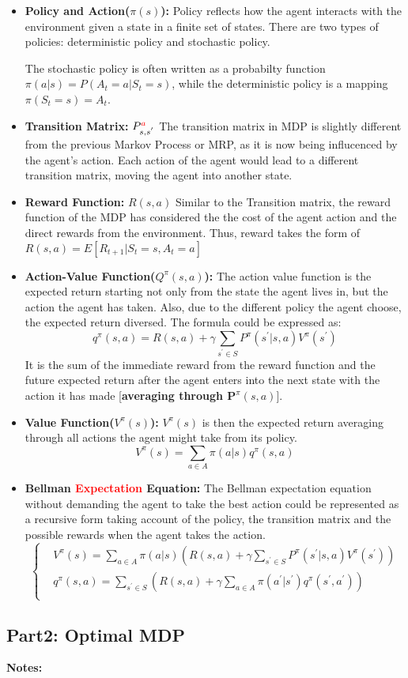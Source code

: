 \documentclass{article}
\begin{document}
\begin{itemize}
    \item \textbf{Policy and Action($\pi(s)$):} Policy reflects how the agent interacts with the environment given a state in a finite set of states.
    There are two types of policies: deterministic policy and stochastic policy. 
    
    The stochastic policy is often written as a probabilty function$\pi(a|s) = P(A_t = a|S_t = s)$, while the deterministic policy is a mapping $\pi(S_t = s) = A_t$.
    \item \textbf{Transition Matrix:} $P^{\textcolor{red}{a}}_{s,s^{'}}$ The transition matrix in MDP is slightly different
    from the previous Markov Process or MRP, as it is now being influcenced by the agent's action. Each action of the agent
    would lead to a different transition matrix, moving the agent into another state. 
    \item \textbf{Reward Function:} $R(s,a)$ Similar to the Transition matrix, the reward function of the MDP has considered
    the the cost of the agent action and the direct rewards from the environment. Thus, reward takes the form of $R(s,a) = 
    E[R_{t+1}|S_t = s, A_t = a]$
    \item \textbf{Action-Value Function($Q^\pi(s,a)$):}  The action value function is the expected return starting not only 
    from the state the agent lives in, but the action the agent has taken. Also, due to the different policy the agent
    choose, the expected return diversed. The formula could be expressed as:
    $$q^\pi(s,a) = R(s,a) + \gamma\sum_{s^{'}\in S}P^\pi(s^{'}|s,a)V^\pi(s^{'})$$
    It is the sum of the immediate reward from the reward function and the future expected return after the agent enters
    into the next state with the action it has made [\textbf{averaging through $\mathbf{P}^\pi(s,a)$}]. 
    \item \textbf{Value Function($V^\pi(s)$):} $V^\pi(s)$ is then the expected return averaging through all actions the 
    agent might take from its policy. 
    $$V^\pi(s) = \sum_{a \in A}\pi(a|s)q^\pi(s,a)$$
    \item \textbf{Bellman \textcolor{red}{Expectation} Equation:} The Bellman expectation equation without demanding
    the agent to take the best action could be represented as a recursive form taking account of the policy, the transition
    matrix and the possible rewards when the agent takes the action.
\begin{equation}
    \left\{\begin{aligned}
    &V^\pi(s) = \sum_{a \in A}\pi(a|s)(R(s,a) + \gamma\sum_{s^{'}\in S}P^\pi(s^{'}|s,a)V^\pi(s^{'})) \\
    &q^\pi(s,a) = \sum_{s^{'} \in S}(R(s,a) + \gamma\sum_{a\in A}\pi(a^{'}|s^{'})q^\pi(s^{'},a^{'})) \\
    \end{aligned}\right.
\end{equation}
\end{itemize}
\vspace{2em} 
\subsection{Part2: Optimal MDP}
\textbf{Notes:}
\end{document}

